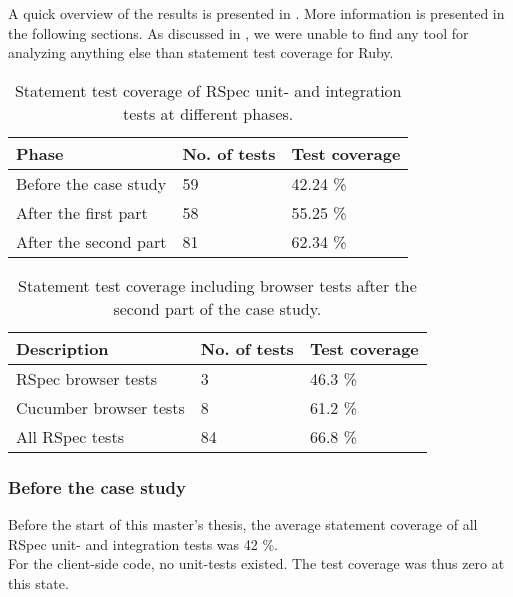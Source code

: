\label{sec:results_coverage}

A quick overview of the results is presented in
. More information is presented in the following
sections. As discussed in , we were unable
to find any tool for analyzing anything else than statement test
coverage for Ruby.\\

\begin{table}[t]
    \centering
    \begin{tabular}{l l l}
        Phase & No. of tests & Test coverage\\
        \hline
        Before the case study &       59 & 42.24 \%\\
        After the first part  &       58 & 55.25 \%\\
        After the second part &       81 & 62.34 \%\\
    \end{tabular}
    \caption{ Statement test coverage of RSpec unit- and integration tests at different phases. }
    \label{tab:unit_coverage}
\end{table}

\begin{table}[t]
    \centering
    \begin{tabular}{l l l}
        Description & No. of tests & Test coverage\\
        \hline
        RSpec browser tests &     3 & 46.3 \%\\
        Cucumber browser tests &  8 & 61.2 \%\\
        All RSpec tests &        84 & 66.8 \%\\
    \end{tabular}
    \caption{ Statement test coverage including browser tests after the second part of the case study. }
    \label{tab:browser_coverage}
\end{table}

\subsubsection{Before the case study}

Before the start of this master's thesis, the average statement coverage
of all RSpec unit- and integration tests was 42 \%.\\

For the client-side code, no unit-tests existed. The test coverage was
thus zero at this state.\\


